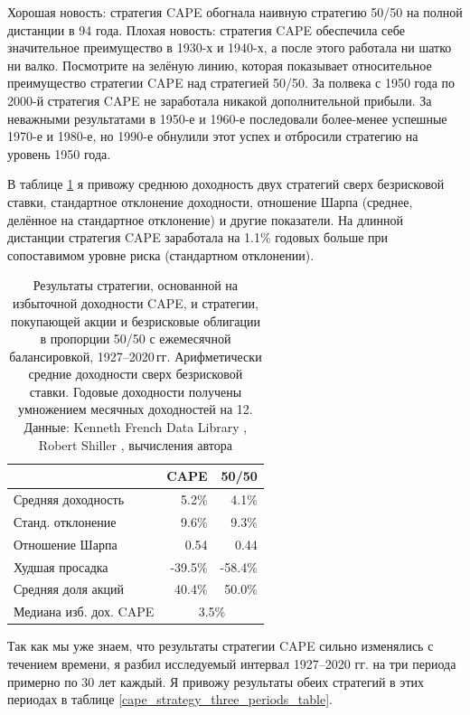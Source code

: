 Хорошая новость: стратегия CAPE обогнала наивную стратегию 50/50 на полной 
дистанции в 94 года. Плохая новость: стратегия CAPE обеспечила себе 
значительное преимущество в 1930-х и 1940-х, а после этого работала ни шатко 
ни валко. Посмотрите на зелёную линию, которая показывает относительное 
преимущество стратегии CAPE над стратегией 50/50. За полвека с 1950 года по 
2000-й стратегия CAPE не заработала никакой дополнительной прибыли. За 
неважными результатами в 1950-е и 1960-е последовали более-менее успешные
1970-е и 1980-е, но 1990-е обнулили этот успех и отбросили стратегию на 
уровень 1950 года.

В таблице \ref{cape_strategy_1927_table} я привожу среднюю доходность двух 
стратегий сверх безрисковой ставки, стандартное отклонение доходности, 
отношение Шарпа (среднее, делённое на стандартное отклонение) и другие 
показатели. На длинной дистанции стратегия CAPE заработала на 1.1\% годовых 
больше при сопоставимом уровне риска (стандартном отклонении).

\begin{table}[h!]
\centering
\begin{tabular}{l|r|r}
                       & CAPE    & 50/50   \\ \hline
Средняя доходность     &   5.2\% &   4.1\% \\
Станд. отклонение      &   9.6\% &   9.3\% \\
Отношение Шарпа        &   0.54  &   0.44  \\
Худшая просадка        & -39.5\% & -58.4\% \\
Средняя доля акций     &  40.4\% &  50.0\% \\
\cline{2-3}
Медиана изб. дох. CAPE & \multicolumn{2}{c}{3.5\%}
\end{tabular}
\caption{Результаты стратегии, основанной на избыточной доходности CAPE, и 
стратегии, покупающей акции и безрисковые облигации в пропорции 50/50 с 
ежемесячной балансировкой, 1927--2020\,гг.
Арифметически средние доходности сверх безрисковой ставки.
Годовые доходности получены умножением месячных доходностей на 12.
Данные: Kenneth French Data Library 
\cite{kennethFrench}, Robert Shiller \cite{shillerOnline}, вычисления автора}
\label{cape_strategy_1927_table}
\end{table}

Так как мы уже знаем, что результаты стратегии CAPE сильно изменялись с 
течением времени, я разбил исследуемый интервал 1927--2020 гг. на три периода 
примерно по 30 лет каждый. Я привожу результаты обеих стратегий в этих 
периодах в таблице \ref{cape_strategy_three_periods_table}.

